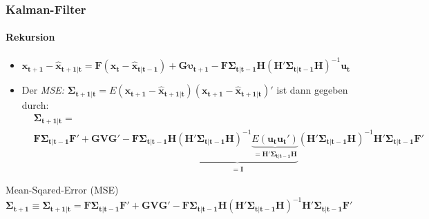 \documentclass{beamer} %
\begin{document}
\begin{frame}\frametitle{Kalman-Filter}\framesubtitle{Rekursion}
\begin{itemize}
\item $\mathbf{x_{t+1}} - \mathbf{\widehat{x}_{t+1|t}} = \mathbf{F}\left(\mathbf{x_{t}} - \mathbf{\widehat{x}_{t|t-1}}\right) + \mathbf{G} \boldsymbol{\upsilon_{t+1}} - \mathbf{F}\boldsymbol{\Sigma_{t|t-1}} \mathbf{H} \left(\mathbf{H}'\boldsymbol{\Sigma_{t|t-1}}\mathbf{H}\right)^{-1} \mathbf{u_t}$
\item Der \emph{MSE: } $\boldsymbol{\Sigma_{t+1|t} }= E\left(\mathbf{x_{t+1}} - \mathbf{\widehat{x}_{t+1|t}}\right)\left(\mathbf{x_{t+1}} - \mathbf{\widehat{x}_{t+1|t}}\right)'$ ist dann gegeben durch:
\scriptsize\begin{align*}
    &\boldsymbol{\Sigma_{t+1|t} }=\\
    & \mathbf{F} \boldsymbol{\Sigma_{t|t-1}} \mathbf{F'} + \mathbf{G} \mathbf{V} \mathbf{G}' - \mathbf{F}\boldsymbol{\Sigma_{t|t-1}} \mathbf{H} \underbrace{\left(\mathbf{H}'\boldsymbol{\Sigma_{t|t-1}}\mathbf{H}\right)^{-1} \underbrace{E(\mathbf{u_t} \mathbf{u_t'})}_{=\mathbf{H'} \boldsymbol{\Sigma_{t|t-1}} \mathbf{H}}}_{=\mathbf{I}}
    \left(\mathbf{H}'\boldsymbol{\Sigma_{t|t-1}}\mathbf{H}\right)^{-1} \mathbf{H}' \boldsymbol{\Sigma_{t|t-1}} \mathbf{F}'
\end{align*}
\end{itemize}
\scriptsize\begin{block}{Mean-Sqared-Error (MSE)}\centering
$
\boldsymbol{\Sigma_{t+1} } \equiv \boldsymbol{\Sigma_{t+1|t} }      = \mathbf{F} \boldsymbol{\Sigma_{t|t-1}} \mathbf{F'} + \mathbf{G} \mathbf{V} \mathbf{G}' - \mathbf{F}\boldsymbol{\Sigma_{t|t-1}} \mathbf{H} \left(\mathbf{H}'\boldsymbol{\Sigma_{t|t-1}}\mathbf{H}\right)^{-1} \mathbf{H}' \boldsymbol{\Sigma_{t|t-1}}\mathbf{F}'
$
\end{block}
\end{frame}
\end{document}
